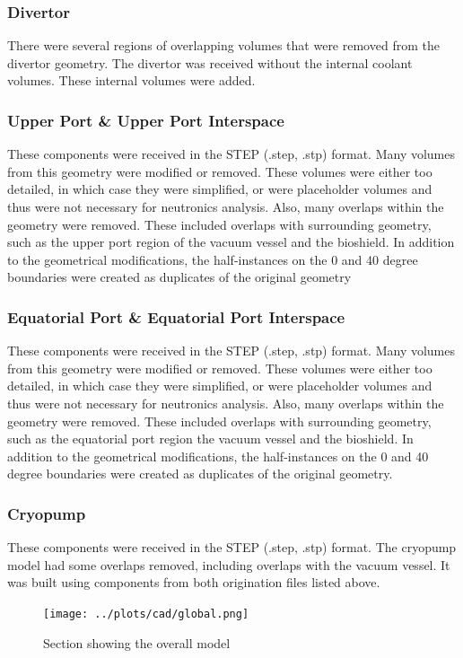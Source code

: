 \documentclass[12pt]{article}
\begin{document}
\subsubsection*{Divertor}
There were several regions of overlapping volumes that were removed from the 
divertor geometry. The divertor was received without the internal coolant 
volumes. These internal volumes were added.
\subsubsection*{Upper Port \& Upper Port Interspace}
These components were received in the STEP (.step, .stp) format. Many volumes 
from this geometry were modified or removed. These volumes were either too
detailed, in which case they were simplified, or were placeholder volumes and 
thus were not necessary for neutronics analysis. Also, many overlaps within the 
geometry were removed. These included overlaps with surrounding geometry, such 
as the upper port region of the vacuum vessel and the bioshield. In addition to 
the geometrical modifications, the half-instances on the 0 and 40 degree 
boundaries were created as duplicates of the original geometry

\subsubsection*{Equatorial Port \& Equatorial Port Interspace}
These components were received in the STEP (.step, .stp) format. Many volumes 
from this geometry were modified or removed. These volumes were either too 
detailed, in which case they were simplified, or were placeholder volumes 
and thus were not necessary for neutronics analysis. Also, many overlaps
within the geometry were removed. These included overlaps with surrounding 
geometry, such as the equatorial port region the vacuum vessel and the bioshield. 
In addition to the geometrical modifications, the half-instances on the 0 and 40
degree boundaries were created as duplicates of the original geometry.

\subsubsection*{Cryopump}
These components were received in the STEP (.step, .stp) format. The
cryopump model had some overlaps removed, including overlaps with the vacuum 
vessel. It was built using components from both origination files listed above.

\begin{figure}[ht!]
  \centering
  \texttt{[image: ../plots/cad/global.png]}
  \caption{Section showing the overall model}
  \label{fig:cad_iter_global}
\end{figure}
\end{document}
